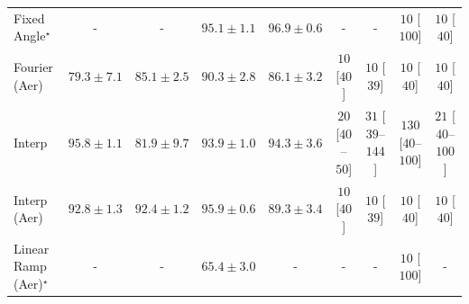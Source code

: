 \begin{tabular}{l|cccc|cccc|}
Fixed Angle$^\star$ & {\cellcolor[HTML]{000000}} \color[HTML]{F1F1F1} {\cellcolor{white}} \color{black} - & {\cellcolor[HTML]{000000}} \color[HTML]{F1F1F1} {\cellcolor{white}} \color{black} - & {\cellcolor[HTML]{802D05}} \color[HTML]{F1F1F1} $95.1\pm 1.1$ & {\cellcolor[HTML]{692606}} \color[HTML]{F1F1F1} $96.9\pm 0.6$ & {\cellcolor[HTML]{000000}} \color[HTML]{F1F1F1} {\cellcolor{white}} \color{black} - & {\cellcolor[HTML]{000000}} \color[HTML]{F1F1F1} {\cellcolor{white}} \color{black} - & {\cellcolor[HTML]{FFF7F3}} \color[HTML]{000000} $10$ [$100$] & {\cellcolor[HTML]{FFF7F3}} \color[HTML]{000000} $10$ [$40$] \\
Fourier (Aer) & {\cellcolor[HTML]{FEAF3D}} \color[HTML]{000000} $79.3\pm 7.1$ & {\cellcolor[HTML]{ED7215}} \color[HTML]{F1F1F1} $85.1\pm 2.5$ & {\cellcolor[HTML]{BE4503}} \color[HTML]{F1F1F1} $90.3\pm 2.8$ & {\cellcolor[HTML]{E56910}} \color[HTML]{F1F1F1} $86.1\pm 3.2$ & {\cellcolor[HTML]{FFF7F3}} \color[HTML]{000000} $10$ [$40$] & {\cellcolor[HTML]{FFF7F3}} \color[HTML]{000000} $10$ [$39$] & {\cellcolor[HTML]{FFF7F3}} \color[HTML]{000000} $10$ [$40$] & {\cellcolor[HTML]{FFF7F3}} \color[HTML]{000000} $10$ [$40$] \\
Interp & {\cellcolor[HTML]{782A05}} \color[HTML]{F1F1F1} $95.8\pm 1.1$ & {\cellcolor[HTML]{FB9326}} \color[HTML]{000000} $81.9\pm 9.7$ & {\cellcolor[HTML]{903104}} \color[HTML]{F1F1F1} $93.9\pm 1.0$ & {\cellcolor[HTML]{8B3005}} \color[HTML]{F1F1F1} $94.3\pm 3.6$ & {\cellcolor[HTML]{FFF5F1}} \color[HTML]{000000} $20$ [$40$--$50$] & {\cellcolor[HTML]{FFF2EE}} \color[HTML]{000000} $31$ [$39$--$144$] & {\cellcolor[HTML]{FDD6D2}} \color[HTML]{000000} $130$ [$40$--$100$] & {\cellcolor[HTML]{FFF4F0}} \color[HTML]{000000} $21$ [$40$--$100$] \\
Interp (Aer) & {\cellcolor[HTML]{9E3604}} \color[HTML]{F1F1F1} $92.8\pm 1.3$ & {\cellcolor[HTML]{A33904}} \color[HTML]{F1F1F1} $92.4\pm 1.2$ & {\cellcolor[HTML]{762A05}} \color[HTML]{F1F1F1} $95.9\pm 0.6$ & {\cellcolor[HTML]{CB4B02}} \color[HTML]{F1F1F1} $89.3\pm 3.4$ & {\cellcolor[HTML]{FFF7F3}} \color[HTML]{000000} $10$ [$40$] & {\cellcolor[HTML]{FFF7F3}} \color[HTML]{000000} $10$ [$39$] & {\cellcolor[HTML]{FFF7F3}} \color[HTML]{000000} $10$ [$40$] & {\cellcolor[HTML]{FFF7F3}} \color[HTML]{000000} $10$ [$40$] \\
Linear Ramp (Aer)$^\star$ & {\cellcolor[HTML]{000000}} \color[HTML]{F1F1F1} {\cellcolor{white}} \color{black} - & {\cellcolor[HTML]{000000}} \color[HTML]{F1F1F1} {\cellcolor{white}} \color{black} - & {\cellcolor[HTML]{FFFFE5}} \color[HTML]{000000} $65.4\pm 3.0$ & {\cellcolor[HTML]{000000}} \color[HTML]{F1F1F1} {\cellcolor{white}} \color{black} - & {\cellcolor[HTML]{000000}} \color[HTML]{F1F1F1} {\cellcolor{white}} \color{black} - & {\cellcolor[HTML]{000000}} \color[HTML]{F1F1F1} {\cellcolor{white}} \color{black} - & {\cellcolor[HTML]{FFF7F3}} \color[HTML]{000000} $10$ [$100$] & {\cellcolor[HTML]{000000}} \color[HTML]{F1F1F1} {\cellcolor{white}} \color{black} - \\

\end{tabular}
